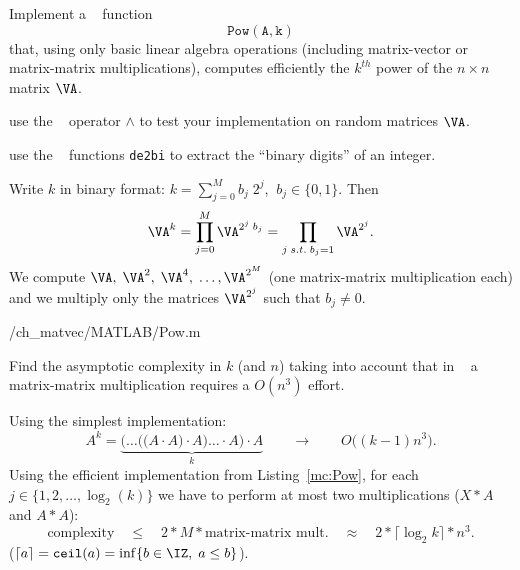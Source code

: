 \renewcommand{\chpt}{ch_matvec}

\begin{problem} \label{prb:Powers}

\begin{subproblem}[2] \label{subprb:Powers_1}
Implement a \Matlab~ function 
$$\mathtt{Pow(A,k)}$$
that, using only basic linear algebra operations (including matrix-vector or matrix-matrix multiplications), 
computes efficiently the $k^{th}$ power of the $n\times n$ matrix $\VA$.

\begin{hint}
 use the \Matlab~ operator $\wedge$ to test your implementation on random matrices $\VA$.
\end{hint}

\begin{hint}
 use the \Matlab~ functions \texttt{de2bi} to extract the ``binary digits'' of an integer. 
\end{hint}

\begin{solution}
Write $k$ in binary format: $k=\sum_{j=0}^M b_j\;2^j$,  $\:b_j\in\{0,1\}$. Then
$$\VA^k = \prod_{j=0}^M \VA^{2^j\; b_j} = \prod_{j\;s.t.\;b_j=1} \VA^{2^j}. $$
We compute $\VA,\;\VA^2,\;\VA^4,\;\ldots,\VA^{2^M}$ (one matrix-matrix multiplication each) and we multiply only the matrices $\VA^{2^j}$ such that $b_j\ne 0$.


{\problems/\chpt/MATLAB/Pow.m}
\end{solution}
\end{subproblem}



\begin{subproblem}[1] \label{subprb:Powers_2}
Find the asymptotic complexity in $k$ (and $n$) taking into account that in \Matlab~ a matrix-matrix multiplication requires a $O(n^3)$ effort.

\begin{solution}
Using the simplest implementation:
$$A^k = \underbrace{\bigg(\ldots\Big(\big(A\cdot A\big)\cdot A\Big)\ldots \cdot A \bigg)\cdot A}_{k} \qquad \rightarrow \qquad O\big((k-1)n^3\big).$$
Using the efficient implementation from Listing~\ref{mc:Pow}, for each $j\in\{1,2,\ldots,\log_2(k)\}$
we have to perform at most two multiplications ($X*A$ and $A*A$):
$$ \text{complexity}\quad\leq \quad 2 * M * \text{matrix-matrix mult.} \quad \approx \quad 2 * \lceil\log_2 k\rceil * n^3.$$
($\lceil a\rceil = \mathtt{ceil}(a) =\inf\{ b\in\IZ,\; a\leq b\} $).
\end{solution}
\end{subproblem}



\end{problem}
